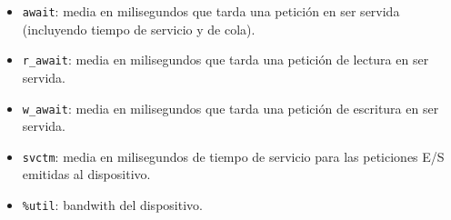\documentclass[a4paper,10pt]{article}
\begin{document}
\begin{itemize}
 \item{\texttt{await}}: media en milisegundos que tarda una petición en ser servida (incluyendo tiempo de servicio y de cola).
 \item{\texttt{r\_await}}: media en milisegundos que tarda una petición de lectura en ser servida.
 \item{\texttt{w\_await}}: media en milisegundos que tarda una petición de escritura en ser servida.
 \item{\texttt{svctm}}: media en milisegundos de tiempo de servicio para las peticiones E/S emitidas al dispositivo.
 \item{\texttt{\%util}}: bandwith del dispositivo.
\end{itemize}

\newpage

\newpage
\printbibliography
\end{document}
